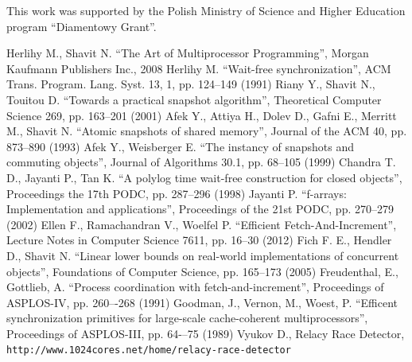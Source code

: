 \documentclass[a4paper,11pt]{article}
\begin{document}
This work was supported by the Polish Ministry of Science and Higher Education program ``Diamentowy Grant''.

\newpage

\begin{thebibliography}{9}
	 Herlihy M., Shavit N. ``The Art of Multiprocessor Programming'', Morgan Kaufmann Publishers Inc., 2008
	 Herlihy M. ``Wait-free synchronization'', ACM Trans. Program. Lang. Syst. 13, 1, pp. 124--149 (1991)
	 Riany Y., Shavit N., Touitou D. ``Towards a practical snapshot algorithm'', Theoretical Computer Science 269, pp. 163--201 (2001)
	 Afek Y., Attiya H., Dolev D., Gafni E., Merritt M., Shavit N. ``Atomic snapshots of shared memory'', Journal of the ACM 40, pp. 873--890 (1993)
	 Afek Y., Weisberger E. ``The instancy of snapshots and commuting objects'', Journal of Algorithms 30.1, pp. 68--105 (1999)
	 Chandra T. D., Jayanti P., Tan K. ``A polylog time wait-free construction for closed objects'', Proceedings the 17th PODC, pp. 287--296 (1998)
	 Jayanti P. ``f-arrays: Implementation and applications'', Proceedings of the 21st PODC, pp. 270--279 (2002)
	 Ellen F., Ramachandran V., Woelfel P. ``Efficient Fetch-And-Increment'', Lecture Notes in Computer Science 7611, pp. 16--30 (2012)
	 Fich F. E., Hendler D., Shavit N. ``Linear lower bounds on real-world implementations of concurrent objects'', Foundations of Computer Science, pp. 165--173 (2005)
	 Freudenthal, E., Gottlieb, A. ``Process coordination with fetch-and-increment'', Proceedings of ASPLOS-IV, pp. 260–-268 (1991)
	 Goodman, J., Vernon, M., Woest, P. ``Efficent synchronization primitives for large-scale cache-coherent multiprocessors'', Proceedings of ASPLOS-III, pp. 64-–75 (1989)
	 Vyukov D., Relacy Race Detector, \verb+http://www.1024cores.net/home/relacy-race-detector+
\end{thebibliography}
\end{document}
